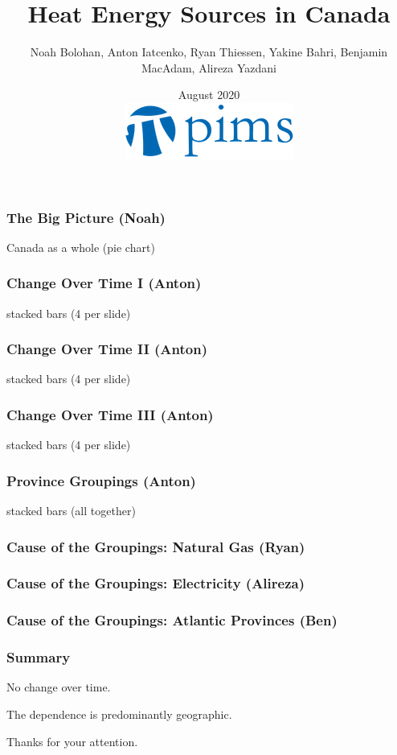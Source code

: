 \documentclass{beamer}
\title{Heat Energy Sources in Canada}
\author{Noah Bolohan, Anton Iatcenko, Ryan Thiessen, Yakine Bahri, Benjamin MacAdam, Alireza Yazdani}
\institute{Math\textsuperscript{Industry}}
\date{August 2020  \\ \vspace{30pt} \includegraphics[scale=0.3]{pims_logo.png} }
\begin{document}
\frame{\titlepage}



\begin{frame}
\frametitle{The Big Picture (Noah)}
Canada as a whole (pie chart)
\end{frame}


\begin{frame}
\frametitle{Change Over Time I (Anton)}
stacked bars (4 per slide)
\end{frame}


\begin{frame}
\frametitle{Change Over Time II (Anton)}
stacked bars (4 per slide)
\end{frame}


\begin{frame}
\frametitle{Change Over Time III (Anton)}
stacked bars (4 per slide)
\end{frame}


\begin{frame}
\frametitle{Province Groupings (Anton)}
stacked bars (all together)
\end{frame}


\begin{frame}
\frametitle{Cause of the Groupings: Natural Gas (Ryan)}

\end{frame}


\begin{frame}
\frametitle{Cause of the Groupings: Electricity (Alireza)}

\end{frame}


\begin{frame}
\frametitle{Cause of the Groupings: Atlantic Provinces (Ben)}

\end{frame}



\begin{frame}
\frametitle{Summary}

No change over time. 

The dependence is predominantly geographic. 

Thanks for your attention.  

\end{frame}
\end{document}
